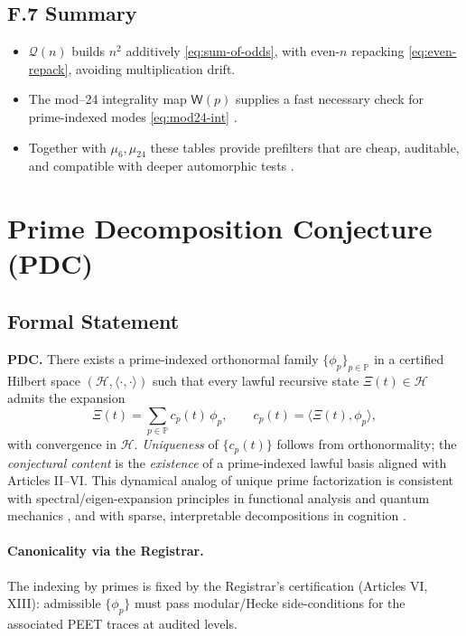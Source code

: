 \documentclass[12pt]{amsart}
\theoremstyle{plain}
\begin{document}
\subsection*{F.7 Summary}
\begin{itemize}
  \item $\mathcal{Q}(n)$ builds $n^{2}$ additively \eqref{eq:sum-of-odds}, with even-$n$ repacking \eqref{eq:even-repack}, avoiding multiplication drift.
  \item The mod–24 integrality map $\mathsf{W}(p)$ supplies a fast necessary check for prime-indexed modes \eqref{eq:mod24-int} \cite{hardy2008introduction}.
  \item Together with $\mu_6,\mu_{24}$ these tables provide prefilters that are cheap, auditable, and compatible with deeper automorphic tests \cite{sturm1987congruence,diamond2005first}.
\end{itemize}

\section{Prime Decomposition Conjecture (PDC)}

\subsection{Formal Statement}
\textbf{PDC.} There exists a prime-indexed orthonormal family $\{\phi_p\}_{p\in\mathbb{P}}$ in a certified Hilbert space $(\mathcal{H},\langle\cdot,\cdot\rangle)$ such that every lawful recursive state $\Xi(t)\in\mathcal{H}$ admits the expansion
\[
\Xi(t)=\sum_{p\in\mathbb{P}} c_p(t)\,\phi_p,\qquad c_p(t)=\langle \Xi(t),\phi_p\rangle,
\]
with convergence in $\mathcal{H}$. \emph{Uniqueness} of $\{c_p(t)\}$ follows from orthonormality; the \emph{conjectural content} is the \emph{existence} of a prime-indexed lawful basis aligned with Articles II–VI. This dynamical analog of unique prime factorization is consistent with spectral/eigen-expansion principles in functional analysis and quantum mechanics \cite{rudin1991functional,conway1990functional,lax2002functional,nielsen2010quantum}, and with sparse, interpretable decompositions in cognition \cite{olshausen1996emergence}.

\paragraph{Canonicality via the Registrar.}
The indexing by primes is fixed by the Registrar’s certification (Articles VI, XIII): admissible $\{\phi_p\}$ must pass modular/Hecke side-conditions for the associated PEET traces at audited levels.
\end{document}
